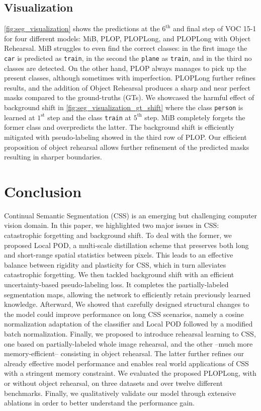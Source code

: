 \subsection{Visualization}

\autoref{fig:seg_visualization} shows the predictions at the $6^\text{th}$ and final step of VOC
15-1 for four different models: MiB, PLOP, PLOPLong, and PLOPLong with Object Rehearsal. MiB
struggles to even find the correct classes: in the first image the \texttt{car} is predicted as
\texttt{train}, in the second the \texttt{plane} as \texttt{train}, and in the third no classes are
detected. On the other hand, PLOP always manages to pick up the present classes, although sometimes
with imperfection. PLOPLong further refines results, and the addition of Object Rehearsal produces a
sharp and near perfect masks compared to the ground-truths (GTs). We showcased the harmful effect of
background shift in \autoref{fig:seg_visualization_gt_shift} where the class \texttt{person} is
learned at $1^\text{st}$ step and the class \texttt{train} at $5^\text{th}$ step. MiB completely
forgets the former class and overpredicts the latter. The background shift is efficiently mitigated
with pseudo-labeling showed in the third row of PLOP. Our efficient proposition of object rehearsal
allows further refinement of the predicted masks resulting in sharper boundaries.

\section{Conclusion}
\label{sec:seg_conclusion}

Continual Semantic Segmentation (\ac{CSS}) is an emerging but challenging computer vision domain. In
this paper, we highlighted two major issues in \ac{CSS}: catastrophic forgetting and background
shift. To deal with the former, we proposed Local POD, a multi-scale distillation scheme that
preserves both long and short-range spatial statistics between pixels. This leads to an effective
balance between rigidity and plasticity for \ac{CSS}, which in turn alleviates catastrophic
forgetting. We then tackled background shift with an efficient uncertainty-based pseudo-labeling
loss. It completes the partially-labeled segmentation maps, allowing the network to efficiently
retain previously learned knowledge. Afterward, We showed that carefully designed structural changes
to the model could improve performance on long \ac{CSS} scenarios, namely a cosine normalization
adaptation of the classifier and Local POD followed by a modified batch normalization. Finally, we
proposed to introduce rehearsal learning to \ac{CSS}, one based on partially-labeled whole image
rehearsal, and the other --much more memory-efficient-- consisting in object rehearsal. The latter
further refines our already effective model performance and enables real world applications of
\ac{CSS} with a stringent memory constraint. We evaluated the proposed PLOPLong, with or without
object rehearsal, on three datasets and over twelve different benchmarks. Finally, we qualitatively
validate our model through extensive ablations in order to better understand the performance gain.
